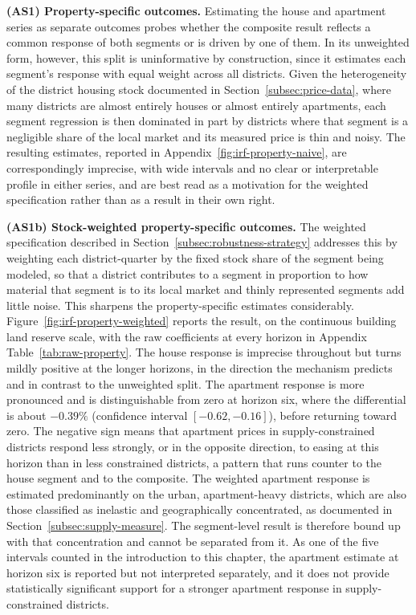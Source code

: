\documentclass[a4paper,12pt, headsepline]{scrartcl}
\numberwithin{equation}{section}
\begin{document}
\textbf{(AS1) Property-specific outcomes.} Estimating the house and apartment series as separate outcomes probes whether the composite result reflects a common response of both segments or is driven by one of them. In its unweighted form, however, this split is uninformative by construction, since it estimates each segment's response with equal weight across all districts. Given the heterogeneity of the district housing stock documented in Section~\ref{subsec:price-data}, where many districts are almost entirely houses or almost entirely apartments, each segment regression is then dominated in part by districts where that segment is a negligible share of the local market and its measured price is thin and noisy. The resulting estimates, reported in Appendix~\ref{fig:irf-property-naive}, are correspondingly imprecise, with wide intervals and no clear or interpretable profile in either series, and are best read as a motivation for the weighted specification rather than as a result in their own right.

\textbf{(AS1b) Stock-weighted property-specific outcomes.} The weighted specification described in Section~\ref{subsec:robustness-strategy} addresses this by weighting each district-quarter by the fixed stock share of the segment being modeled, so that a district contributes to a segment in proportion to how material that segment is to its local market and thinly represented segments add little noise. This sharpens the property-specific estimates considerably. Figure~\ref{fig:irf-property-weighted} reports the result, on the continuous building land reserve scale, with the raw coefficients at every horizon in Appendix Table~\ref{tab:raw-property}. The house response is imprecise throughout but turns mildly positive at the longer horizons, in the direction the mechanism predicts and in contrast to the unweighted split. The apartment response is more pronounced and is distinguishable from zero at horizon six, where the differential is about $-0.39\%$ (confidence interval $[-0.62, -0.16]$), before returning toward zero. The negative sign means that apartment prices in supply-constrained districts respond less strongly, or in the opposite direction, to easing at this horizon than in less constrained districts, a pattern that runs counter to the house segment and to the composite. The weighted apartment response is estimated predominantly on the urban, apartment-heavy districts, which are also those classified as inelastic and geographically concentrated, as documented in Section~\ref{subsec:supply-measure}. The segment-level result is therefore bound up with that concentration and cannot be separated from it. As one of the five intervals counted in the introduction to this chapter, the apartment estimate at horizon six is reported but not interpreted separately, and it does not provide statistically significant support for a stronger apartment response in supply-constrained districts.
\end{document}
